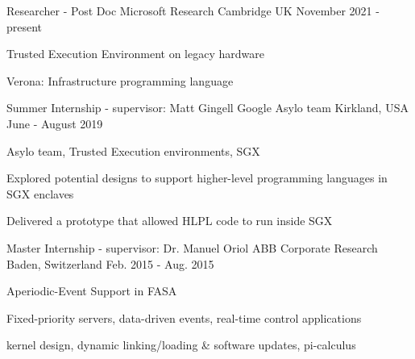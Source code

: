 


\begin{cventries}

\cventry
{Researcher - Post Doc}
{Microsoft Research}
{Cambridge UK}
{November 2021 - present}
{
  \begin{cvitems}
  \item{Trusted Execution Environment on legacy hardware}
  \item{Verona: Infrastructure programming language}
  \end{cvitems}
}

\cventry
{Summer Internship - supervisor: Matt Gingell}
{Google Asylo team}
{Kirkland, USA}
{June - August 2019}
{ 
  \begin{cvitems}
  \item{Asylo team, Trusted Execution environments, SGX}
	\item{Explored potential designs to support higher-level programming languages in SGX enclaves}
  \item{Delivered a prototype that allowed HLPL code to run inside SGX}
	\end{cvitems}
}

\cventry
{Master Internship - supervisor: Dr. Manuel Oriol}
{ABB Corporate Research}
{Baden, Switzerland}
{Feb. 2015 - Aug. 2015}
{
	\begin{cvitems}
  \item{Aperiodic-Event Support in FASA}
  \item{Fixed-priority servers, data-driven events, real-time control applications}
  \item{kernel design, dynamic linking/loading \& software updates, pi-calculus}
	\end{cvitems}
}

\end{cventries}
